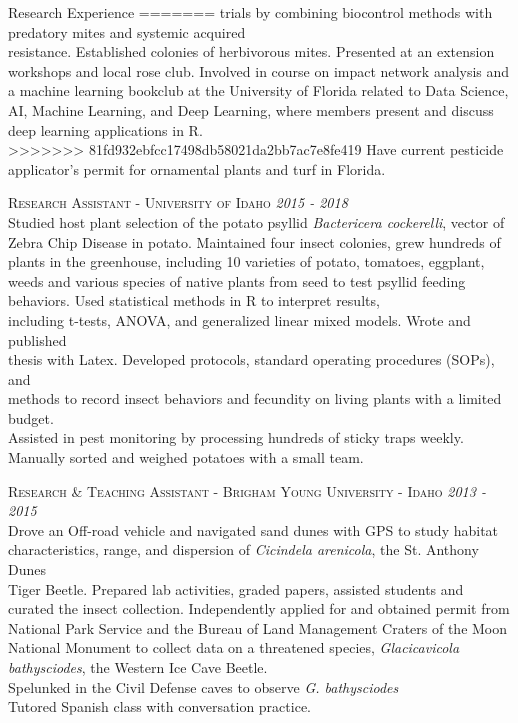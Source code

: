 \documentclass{resume} %
\begin{document}
\begin{rSection}{Research Experience}
=======
trials by combining biocontrol methods with predatory mites and systemic acquired\\ resistance. Established colonies of herbivorous mites. Presented at an extension workshops and local rose club. Involved in course on impact network analysis and a machine learning bookclub at the University of Florida related to Data Science, AI, Machine Learning, and Deep Learning, where members present and discuss deep learning applications in R. \\
>>>>>>> 81fd932ebfcc17498db58021da2bb7ac7e8fe419
Have current pesticide applicator's permit for ornamental plants and turf in Florida.
\hfill

\textsc{Research Assistant - University of Idaho} \hfill {\em \textit{2015 - 2018}}\\
Studied host plant selection of the potato psyllid \textit{Bactericera cockerelli}, vector of Zebra Chip Disease in potato. Maintained four insect colonies, grew hundreds of plants in the greenhouse, including 10 varieties of potato, tomatoes, eggplant, weeds and various species of native plants from seed to test psyllid feeding behaviors. Used statistical methods in R to interpret results,\\
including t-tests, ANOVA, and generalized linear mixed models. Wrote and published\\ thesis with Latex. Developed protocols, standard operating procedures (SOPs), and\\ methods to record insect behaviors and fecundity on living plants with a limited budget.\\
Assisted in pest monitoring by processing hundreds of sticky traps weekly. Manually sorted and weighed potatoes with a small team.\\ \hfill

\textsc{Research \& Teaching Assistant - Brigham Young University - Idaho} \hfill {\em \textit{2013 - 2015}}\\
Drove an Off-road vehicle and navigated sand dunes with GPS to study habitat\\
characteristics, range, and dispersion of \textit{Cicindela arenicola}, the St. Anthony Dunes\\ Tiger Beetle. Prepared lab activities, graded papers, assisted students and curated the insect collection. Independently applied for and obtained permit from National Park Service and the Bureau of Land Management Craters of the Moon National Monument to collect data on a threatened species, \textit{Glacicavicola bathysciodes}, the Western Ice Cave Beetle.\\
Spelunked in the Civil Defense caves to observe \textit{G. bathysciodes}\\
Tutored Spanish class with conversation practice.\\ \hfill



\end{rSection}
\end{document}
